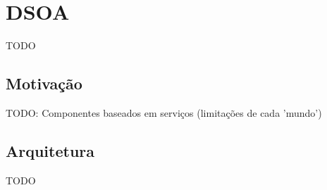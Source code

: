\chapter{DSOA}
\label{ch:3}
TODO
\section{Motivação}
TODO: Componentes baseados em serviços (limitações de cada 'mundo')

\section{Arquitetura}
TODO